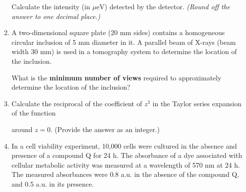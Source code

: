 \documentclass[journal]{IEEEtran}
\begin{document}
\begin{enumerate}
Calculate the intensity (in \(\mu\text{eV}\)) detected by the detector. 
\textit{(Round off the answer to one decimal place.)}

\vspace{1em}

\begin{center}
\end{center}
\hfill{}

\item 
A two-dimensional square plate (20 mm sides) contains a homogeneous circular inclusion of 5 mm diameter in it. A parallel beam of X-rays (beam width 30 mm) is used in a tomography system to determine the location of the inclusion. 

What is the \textbf{minimum number of views} required to approximately determine the location of the inclusion?
\hfill{}

\item 
Calculate the reciprocal of the coefficient of \( z^3 \) in the Taylor series expansion of the function 




around \( z = 0 \). (Provide the answer as an integer.)

\hfill{}

\item 
In a cell viability experiment, 10,000 cells were cultured in the absence and presence of a compound Q for 24 h. The absorbance of a dye associated with cellular metabolic activity was measured at a wavelength of 570 nm at 24 h. The measured absorbances were 0.8 a.u. in the absence of the compound Q, and 0.5 a.u. in its presence.


\end{enumerate}
\end{document}
